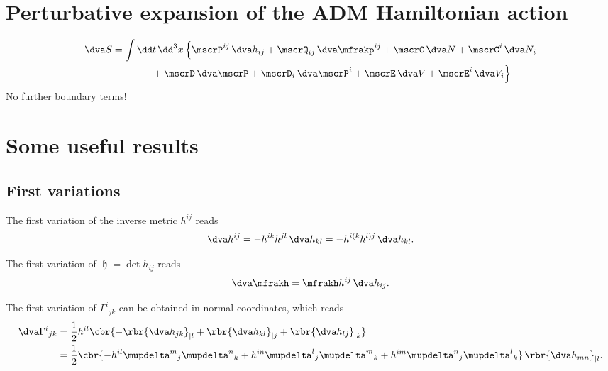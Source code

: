 \documentclass[a4paper,11pt]{article}
\begin{document}
\section{Perturbative expansion of the ADM Hamiltonian action}


\begin{align}
\dva S &= \int\dd t\,\dd^3 x \,\Big\{
\mscrP^{ij}\,\dva h_{ij} + \mscrQ_{ij}\,\dva \mfrakp^{ij} +
\mscrC\,\dva N + \mscrC^i\,\dva N_i
\nonumber \\
&\qquad\qquad
+ \mscrD\,\dva \mscrP + 
\mscrD_i\,\dva \mscrP^i + \mscrE\,\dva V + \mscrE^i\,\dva V_i
\Big\}
\end{align}
No further boundary terms!

\appendix

\section*{Some useful results}

\subsection*{First variations}

The first variation of the inverse metric $h^{ij}$ reads
\begin{align}
\dva h^{ij} = -h^{ik}h^{jl}\,\dva h_{kl} = - h^{i(k}h^{l)j}\,\dva h_{kl}.
\end{align}

The first variation of $\mfrakh = \det h_{ij}$ reads
\begin{align}
\dva \mfrakh = \mfrakh h^{ij}\,\dva h_{ij}.
\end{align}

The first variation of $\Gamma^i{}_{jk}$ can be obtained in normal coordinates,
which reads
\begin{align}
\dva \Gamma^{i}{}_{jk} &= \frac{1}{2} h^{il}
\cbr{-\rbr{\dva h_{jk}}_{|l} + \rbr{\dva h_{kl}}_{|j} + \rbr{\dva h_{lj}}_{|k}}
\\
&= \frac{1}{2} \cbr{-h^{il}\mupdelta^m{}_j\mupdelta^n{}_k
+h^{in}\mupdelta^l{}_j\mupdelta^m{}_k
+h^{im}\mupdelta^n{}_j\mupdelta^l{}_k}\,\rbr{\dva h_{mn}}_{|l}.
\end{align}
\end{document}
